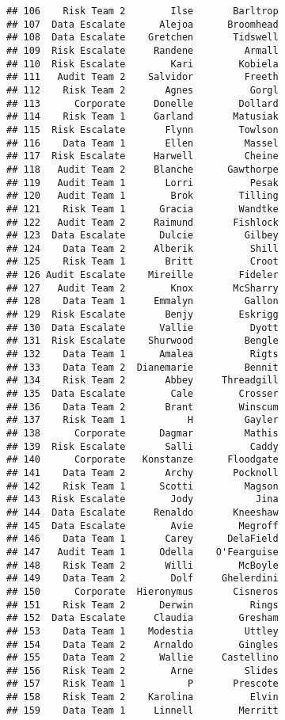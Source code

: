 \documentclass[]{article}
\begin{document}
\begin{verbatim}
## 106    Risk Team 2        Ilse       Barltrop
## 107  Data Escalate      Alejoa      Broomhead
## 108  Data Escalate    Gretchen       Tidswell
## 109  Risk Escalate     Randene         Armall
## 110  Risk Escalate        Kari        Kobiela
## 111   Audit Team 2    Salvidor         Freeth
## 112    Risk Team 2       Agnes          Gorgl
## 113      Corporate     Donelle        Dollard
## 114    Risk Team 1     Garland       Matusiak
## 115  Risk Escalate       Flynn        Towlson
## 116    Data Team 1       Ellen         Massel
## 117  Risk Escalate     Harwell         Cheine
## 118   Audit Team 2     Blanche      Gawthorpe
## 119   Audit Team 1       Lorri          Pesak
## 120   Audit Team 1        Brok        Tilling
## 121    Risk Team 1      Gracia        Wandtke
## 122   Audit Team 2     Raimund       Fishlock
## 123  Data Escalate      Dulcie         Gilbey
## 124    Data Team 2     Alberik          Shill
## 125    Risk Team 1       Britt          Croot
## 126 Audit Escalate    Mireille        Fideler
## 127   Audit Team 2        Knox       McSharry
## 128    Data Team 1     Emmalyn         Gallon
## 129  Risk Escalate       Benjy        Eskrigg
## 130  Data Escalate      Vallie          Dyott
## 131  Risk Escalate    Shurwood         Bengle
## 132    Data Team 1      Amalea          Rigts
## 133    Data Team 2  Dianemarie         Bennit
## 134    Risk Team 2       Abbey     Threadgill
## 135  Data Escalate        Cale        Crosser
## 136    Data Team 2       Brant        Winscum
## 137    Risk Team 1           H         Gayler
## 138      Corporate      Dagmar         Mathis
## 139  Risk Escalate       Salli          Caddy
## 140      Corporate   Konstanze      Floodgate
## 141    Data Team 2       Archy       Pocknoll
## 142    Risk Team 1      Scotti         Magson
## 143  Risk Escalate        Jody           Jina
## 144  Data Escalate     Renaldo       Kneeshaw
## 145  Data Escalate        Avie        Megroff
## 146    Data Team 1       Carey      DelaField
## 147   Audit Team 1      Odella    O'Fearguise
## 148    Risk Team 2       Willi        McBoyle
## 149    Data Team 2        Dolf     Ghelerdini
## 150      Corporate  Hieronymus       Cisneros
## 151    Risk Team 2      Derwin          Rings
## 152  Data Escalate     Claudia        Gresham
## 153    Data Team 1    Modestia         Uttley
## 154    Data Team 2     Arnaldo        Gingles
## 155    Data Team 2      Wallie     Castellino
## 156    Risk Team 2        Arne         Slides
## 157    Risk Team 1           P       Prescote
## 158    Risk Team 2    Karolina          Elvin
## 159    Data Team 1     Linnell        Merritt

\end{verbatim}
\end{document}

